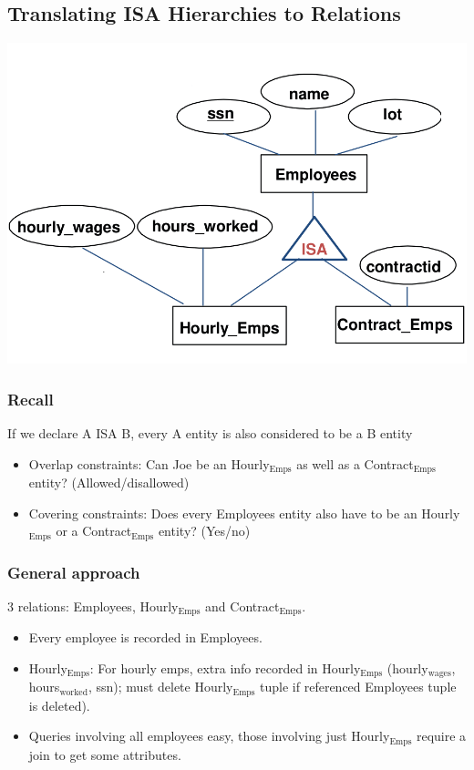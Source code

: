 \documentclass[11pt]{article}
\begin{document}
\subsection{Translating ISA Hierarchies to Relations}
\label{sec:org354a8a0}
\begin{center}
\includegraphics[width=.9\linewidth]{files/Lecture 3/screenshot_2017-03-06_11-54-01.png}
\end{center}
\subsubsection{Recall}
\label{sec:orgb8e2d72}
If we declare A ISA B, every A entity is also considered to be a B entity
\begin{itemize}
\item Overlap constraints: Can Joe be an Hourly\(_{\text{Emps}}\) as well as a Contract\(_{\text{Emps}}\)
entity? (Allowed/disallowed)
\item Covering constraints: Does every Employees entity also have to be an
Hourly\(_{\text{Emps}}\) or a Contract\(_{\text{Emps}}\) entity? (Yes/no)
\end{itemize}
\subsubsection{General approach}
\label{sec:org7969416}
3 relations: Employees, Hourly\(_{\text{Emps}}\) and Contract\(_{\text{Emps}}\).
\begin{itemize}
\item Every employee is recorded in Employees.
\item Hourly\(_{\text{Emps}}\): For hourly emps, extra info recorded in Hourly\(_{\text{Emps}}\)
(hourly\(_{\text{wages}}\), hours\(_{\text{worked}}\), ssn); must delete Hourly\(_{\text{Emps}}\) tuple if
referenced Employees tuple is deleted).
\item Queries involving all employees easy, those involving just Hourly\(_{\text{Emps}}\) require
a join to get some attributes.
\end{itemize}
\end{document}
